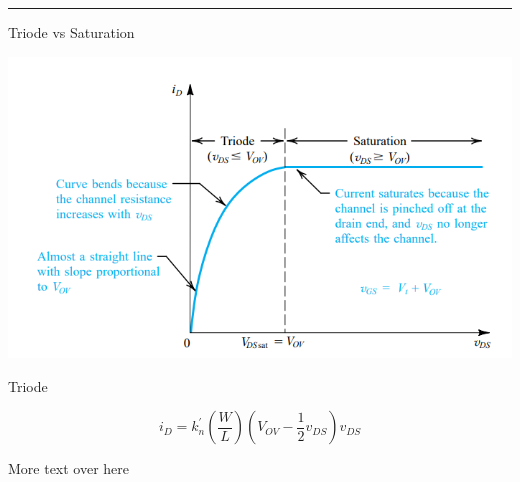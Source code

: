 \documentclass[a4paper]{article}
\begin{document}
\begin{minipage}{5cm}
\hrule
\vspace{1mm}
Triode vs Saturation

\includegraphics[width=\textwidth]{imgs/triode_sat.png}

Triode

$$i_D=k_n^{'}\left(\frac{W}{L}\right)\left(V_{OV}-\frac{1}{2}v_{DS}\right)v_{DS}$$

\end{minipage}
\begin{minipage}{5cm}
    More text over here
\end{minipage}
\end{document}
